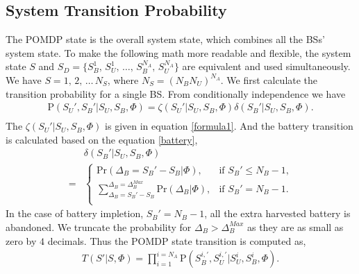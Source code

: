\documentclass[conference]{IEEEtran}
\begin{document}
\subsection{System Transition Probability}
The POMDP state is the overall system state, which combines all the BSs' system state.
To make the following math more readable and flexible,
the system state \(S\) and \(S_D = \{S_B^1,\,S_U^1,\,\ldots,\,S_B^{N_A},\,S_U^{N_A}\}\) 
are equivalent and used simultaneously.
We have \(S = 1,\,2,\, \ldots\,N_S\), where \(N_S = \left(N_BN_U\right)^{N_A}\).
We first calculate the transition probability for a single BS.
From conditionally independence we have
\begin{equation}
\begin{aligned}
	\mbox{P}\left(S_U',S_B'|S_U,S_B,\Phi\right) =
	\zeta\left(S_U'|S_U, S_B, \Phi\right) \delta\left(S_B'|S_U, S_B, \Phi\right).\\
\end{aligned}
\end{equation}
The \(\zeta\left(S_U'|S_U, S_B, \Phi\right)\) is given in equation \eqref{formula1}.
And the battery transition is calculated based on the equation \eqref{battery},
\begin{align}
	&\delta\left(S_B'|S_U, S_B, \Phi\right)\nonumber\\
	= &
	\begin{cases}
		\mbox{Pr}\left(\Delta_B = S_B' - S_B|\Phi \right), &\mbox{if $S_B' \le N_B - 1$,}\\
		\sum_{\Delta_B = S_B' - S_B}^{\Delta_B = \Delta_B^{Max}}\mbox{Pr}\left(\Delta_B|\Phi\right),
		&\mbox{if $S_B' = N_B - 1$.}\\
\end{cases}
\end{align}
In the case of battery impletion, \(S_B'=N_B - 1\), all the extra harvested battery is abandoned.
We truncate the probability for \(\Delta_B >\Delta_B^{Max}\) as they are as small as zero by \(4\) decimals.
Thus the POMDP state transition is computed as,
\begin{align}\label{transition}
	T\left(S'|S,\Phi\right) = \prod_{i = 1}^{i = N_A}\mbox{P}\left(S_B^{i,'}, S_U^{i,'}|S_U^i, S_B^i, \Phi\right).
\end{align}
\end{document}
